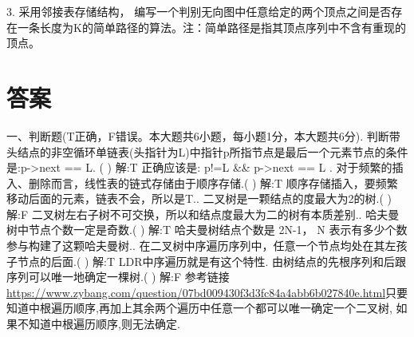 3. 采用邻接表存储结构， 编写一个判别无向图中任意给定的两个顶点之间是否存在一条长度为K的简单路径的算法。注：简单路径是指其顶点序列中不含有重现的顶点。\newline


\section{答案}
一、判断题(T正确，F错误。本大题共6小题，每小题1分，本大题共6分). 判断带头结点的非空循环单链表(头指针为L)中指针p所指节点是最后一个元素节点的条件是:p->next == L. (  )\newline
解:T\newline
正确应该是: p!=L \&\& p->next == L . 对于频繁的插入、删除而言，线性表的链式存储由于顺序存储.(  )\newline
解:T\newline
顺序存储插入，要频繁移动后面的元素，链表不会，所以是T.. 二叉树是一颗结点的度最大为2的树.(  )\newline
解:F\newline
二叉树左右子树不可交换，所以和结点度最大为二的树有本质差别.. 哈夫曼树中节点个数一定是奇数.(  )\newline
解:T\newline
哈夫曼树结点个数是 2N-1， N 表示有多少个数参与构建了这颗哈夫曼树.. 在二叉树中序遍历序列中，任意一个节点均处在其左孩子节点的后面.(  )\newline
解:T\newline
LDR中序遍历就是有这个特性. 由树结点的先根序列和后跟序列可以唯一地确定一棵树.(  )\newline
解:F\newline
参考链接\url{https://www.zybang.com/question/07bd009430f3d3fc84a4abb6b027840e.html}只要知道中根遍历顺序,再加上其余两个遍历中任意一个都可以唯一确定一个二叉树,
如果不知道中根遍历顺序,则无法确定.\newline

